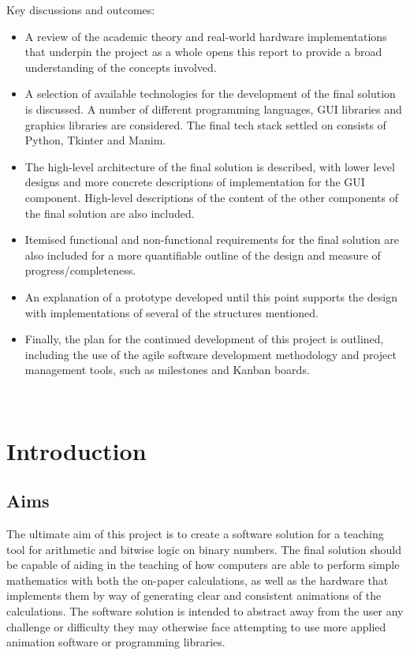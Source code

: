 \documentclass{report}
\begin{document}
\noindent Key discussions and outcomes:
\begin{itemize}
	\item A review of the academic theory and real-world hardware
	implementations that underpin the project as a whole opens this report to
	provide a broad understanding of the concepts involved.
	\item A selection of available technologies for the development of the
	final solution is discussed. A number of different programming languages,
	GUI libraries and graphics libraries are considered. The final tech stack
	settled on consists of Python, Tkinter and Manim.
	\item The high-level architecture of the final solution is described, with
	lower level designs and more concrete descriptions of implementation for
	the GUI component. High-level descriptions of the content of the other
	components of the final solution are also included.
	\item Itemised functional and non-functional requirements for the final
	solution are also included for a more quantifiable outline of the design
	and measure of progress/completeness.
	\item An explanation of a prototype developed until this point supports the
	design with implementations of several of the structures mentioned.
	\item Finally, the plan for the continued development of this project is
	outlined, including the use of the agile software development methodology
	and project management tools, such as milestones and Kanban boards.
\end{itemize}

\newpage \ \newpage

\tableofcontents
{}
\newpage


\chapter*{Introduction}

\section*{Aims}
The ultimate aim of this project is to create a software solution for a
teaching tool for arithmetic and bitwise logic on binary numbers. The final
solution should be capable of aiding in the teaching of how computers are able
to perform simple mathematics with both the on-paper calculations, as well as
the hardware that implements them by way of generating clear and consistent
animations of the calculations. The software solution is intended to abstract
away from the user any challenge or difficulty they may otherwise face
attempting to use more applied animation software or programming libraries.
\end{document}
